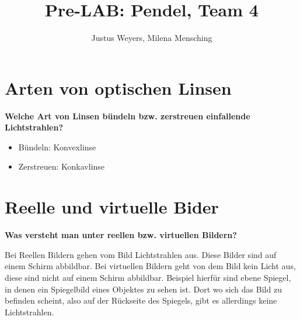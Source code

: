 \documentclass[a4paper, 12pt]{article}
\title{Pre-LAB: Pendel, Team 4}
\author{Justus Weyers, Milena Mensching}
\begin{document}
\maketitle

\section{Arten von optischen Linsen}
\textbf{Welche Art von Linsen bündeln bzw. zerstreuen einfallende Lichtstrahlen?}
\begin{itemize}
	\item Bündeln: Konvexlinse
	\item Zerstreuen: Konkavlinse
\end{itemize}

\section{Reelle und virtuelle Bider}
\textbf{Was versteht man unter reellen bzw. virtuellen Bildern?}

Bei Reellen Bildern gehen vom Bild Lichtstrahlen aus. Diese Bilder sind auf einem Schirm abbildbar. Bei virtuellen Bildern geht von dem Bild kein Licht aus, diese sind nicht auf einem Schirm abbildbar. Beispiel hierfür sind ebene Spiegel, in denen ein Spiegelbild eines Objektes zu sehen ist. Dort wo sich das Bild zu befinden scheint, also auf der Rückseite des Spiegels, gibt es allerdings keine Lichtstrahlen.
\vspace*{0.66cm}
\end{document}
